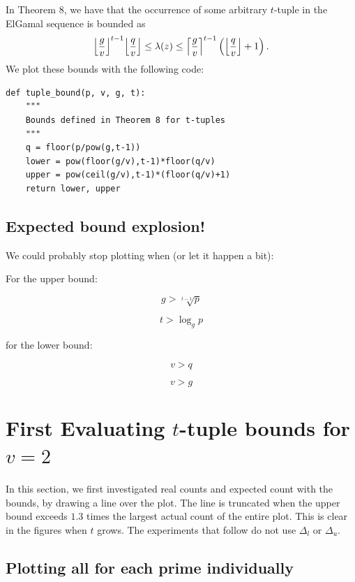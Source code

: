 \documentclass{article}
\DeclarePairedDelimiter{\ceil}{\lceil}{\rceil}
\DeclarePairedDelimiter{\floor}{\lfloor}{\rfloor}
\begin{document}
In Theorem 8, we have that the occurrence of some arbitrary $t$-tuple in the ElGamal sequence is bounded as
$$ \floor*{\frac{g}{v}}^{t-1} \floor*{\frac{q}{v}} \leq \lambda(z) \leq \ceil*{\frac{g}{v}}^{t-1} \left(\floor*{\frac{q}{v}}+1\right).$$
We plot these bounds with the following code:
\begin{Verbatim}[frame=single]
def tuple_bound(p, v, g, t):
    """
    Bounds defined in Theorem 8 for t-tuples
    """
    q = floor(p/pow(g,t-1))
    lower = pow(floor(g/v),t-1)*floor(q/v)
    upper = pow(ceil(g/v),t-1)*(floor(q/v)+1)
    return lower, upper
\end{Verbatim}

\subsection{Expected bound explosion!}

We could probably stop plotting when (or let it happen a bit):

For the upper bound:

$$ g > \sqrt[t-1]{p}$$

$$ t > \log_g p  $$

for the lower bound:

$$ v > q $$

$$ v > g $$


\section{First Evaluating $t$-tuple bounds for $v = 2$}

In this section, we first investigated real counts and expected count with the bounds, by drawing a line over the plot. The line is truncated when the upper bound exceeds $1.3$ times the largest actual count of the entire plot. This is clear in the figures when $t$ grows. The experiments that follow do not use $\Delta_l$ or $\Delta_u$.

\subsection{Plotting all for each prime individually}
\end{document}
